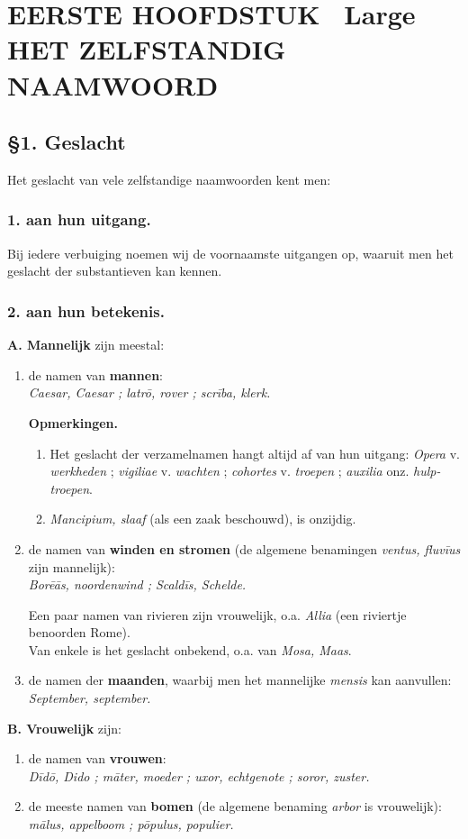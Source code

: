 \documentclass[a4paper,12pt]{article}
\newcommand{\hoofdstuk}[2]{
    \section*{
        \centering 
        \large \MakeUppercase \textbf{#1}
        \ Large \MakeUppercase \textbf{#2}
        }}
\newcommand{\onderwerp}[1]{\subsection*{\centering \textbf{#1}}}
\newcommand{\subonderwerp}[1]{\subsubsection*{\textbf{#1}}}
\newcommand{\opmerking}{\textbf{Opmerkingen.} }
\begin{document}
\hoofdstuk{Eerste hoofdstuk}{Het zelfstandig naamwoord}

\onderwerp{\S 1. Geslacht}

Het geslacht van vele zelfstandige naamwoorden kent men:

\subonderwerp{1. aan hun uitgang.}

Bij iedere verbuiging noemen wij de voornaamste uitgangen op, waaruit men het geslacht der substantieven kan kennen.

\subonderwerp{2. aan hun betekenis.}

\textbf{A. Mannelijk} zijn meestal:

\begin{enumerate}
    \item de namen van \textbf{mannen}:\\
    \textit{Caesar, Caesar ; latrō, rover ; scrība, klerk.}
    
    \opmerking
    \begin{enumerate}
        \item Het geslacht der verzamelnamen hangt altijd af van hun uitgang: \textit{Opera} v. \textit{werkheden} ; \textit{vigiliae} v. \textit{wachten} ; \textit{cohortes} v. \textit{troepen} ; \textit{auxilia} onz. \textit{hulp-troepen}.
        \item \textit{Mancipium, slaaf} (als een zaak beschouwd), is onzijdig.
    \end{enumerate}
    
    \item de namen van \textbf{winden en stromen} (de algemene benamingen \textit{ventus, fluvīus} zijn mannelijk):\\
    \textit{Borēās, noordenwind ; Scaldīs, Schelde.}
    
    Een paar namen van rivieren zijn vrouwelijk, o.a. \textit{Allia} (een riviertje benoorden Rome).\\
    Van enkele is het geslacht onbekend, o.a. van \textit{Mosa, Maas}.
    
    \item de namen der \textbf{maanden}, waarbij men het mannelijke \textit{mensis} kan aanvullen:\\
    \textit{September, september.}
\end{enumerate}

\textbf{B. Vrouwelijk} zijn:

\begin{enumerate}
    \item de namen van \textbf{vrouwen}:\\
    \textit{Dīdō, Dido ; māter, moeder ; uxor, echtgenote ; soror, zuster.}
    
    \item de meeste namen van \textbf{bomen} (de algemene benaming \textit{arbor} is vrouwelijk):\\
    \textit{mālus, appelboom ; pōpulus, populier.}
\end{enumerate}
\end{document}
